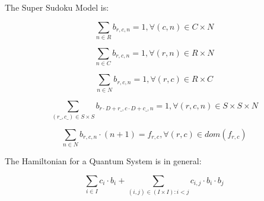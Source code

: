 \documentclass[10pt]{article}
\begin{document}
The Super Sudoku Model  is:


\[\sum_{n \in R} b_{r,c,n} = 1, \forall (c,n) \in C \times N\]

\[\sum_{n \in C} b_{r,c,n} = 1, \forall (r,n) \in R \times N\]

\[\sum_{n \in N} b_{r,c,n} = 1, \forall (r,c) \in R \times C\]

\[\sum_{(r\_, c\_) \in S \times S} b_{r \cdot D + r\_, c \cdot D + c\_, n} = 1, \forall (r,c,n) \in S \times S \times N\]

\[\sum_{n \in N} b_{r,c,n} \cdot (n+1) = f_{r,c}, \forall (r,c) \in dom(f_{r,c})\]


The Hamiltonian for a Quantum System is in general:

\[ \sum_{i \in I} c_i \cdot b_i +  \sum_{(i,j) \in (I \times I):i<j} c_{i,j} \cdot b_i \cdot b_j \]
\end{document}
